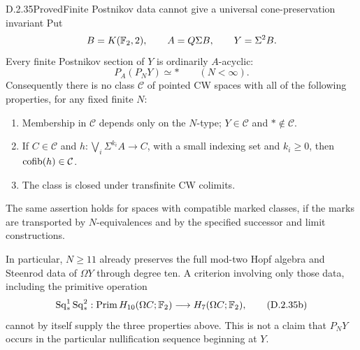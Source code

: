 \begin{claim}{D.2.35}{Proved}{Finite Postnikov data cannot give a universal cone-preservation invariant}
Put
\[
 B=K(\mathbb F_2,2),\qquad A=Q\Sigma B,\qquad Y=\Sigma^2B.
\]
Every finite Postnikov section of $Y$ is ordinarily $A$-acyclic:
\[
                    P_A(P_NY)\simeq *\qquad (N<\infty).
                    \tag{D.2.35a}
\]
Consequently there is no class $\mathcal C$ of pointed CW spaces
with all of the following properties, for any fixed finite $N$:
\begin{enumerate}
\item Membership in $\mathcal C$ depends only on the $N$-type;
      $Y\in\mathcal C$ and $*\notin\mathcal C$.
\item If $C\in\mathcal C$ and
      $h:\bigvee_i\Sigma^{k_i}A\to C$, with a small indexing
      set and $k_i\geq0$, then $\operatorname{cofib}(h)\in\mathcal C$.
\item The class is closed under transfinite CW colimits.
\end{enumerate}
The same assertion holds for spaces with compatible marked
classes, if the marks are transported by $N$-equivalences and
by the specified successor and limit constructions.

In particular, $N\geq11$ already preserves the full mod-two
Hopf algebra and Steenrod data of $\Omega Y$ through degree ten.
A criterion involving only those data, including the primitive
operation
\[
 \operatorname{Sq}_*^1\operatorname{Sq}_*^2:
       \operatorname{Prim}H_{10}(\Omega C;\mathbb F_2)
                    \longrightarrow H_7(\Omega C;\mathbb F_2),
                    \tag{D.2.35b}
\]
cannot by itself supply the three properties above. This is
not a claim that $P_NY$ occurs in the particular nullification
sequence beginning at $Y$.
\end{claim}
